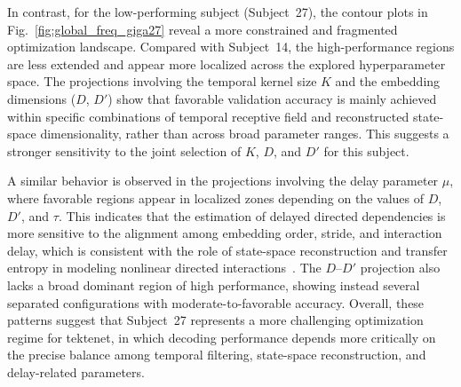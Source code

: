
{In contrast, for the low-performing subject (Subject~27), the contour plots in Fig.~\ref{fig:global_freq_giga27} reveal a more constrained and fragmented optimization landscape. Compared with Subject~14, the high-performance regions are less extended and appear more localized across the explored hyperparameter space. The projections involving the temporal kernel size $K$ and the embedding dimensions ($D$, $D'$) show that favorable validation accuracy is mainly achieved within specific combinations of temporal receptive field and reconstructed state-space dimensionality, rather than across broad parameter ranges. This suggests a stronger sensitivity to the joint selection of $K$, $D$, and $D'$ for this subject.}

{A similar behavior is observed in the projections involving the delay parameter $\mu$, where favorable regions appear in localized zones depending on the values of $D$, $D'$, and $\tau$. This indicates that the estimation of delayed directed dependencies is more sensitive to the alignment among embedding order, stride, and interaction delay, which is consistent with the role of state-space reconstruction and transfer entropy in modeling nonlinear directed interactions~\cite{schreiber2000measuring,staniek2008symbolic}. The $D$--$D'$ projection also lacks a broad dominant region of high performance, showing instead several separated configurations with moderate-to-favorable accuracy. Overall, these patterns suggest that Subject~27 represents a more challenging optimization regime for \gls{tektenet}, in which decoding performance depends more critically on the precise balance among temporal filtering, state-space reconstruction, and delay-related parameters.}

